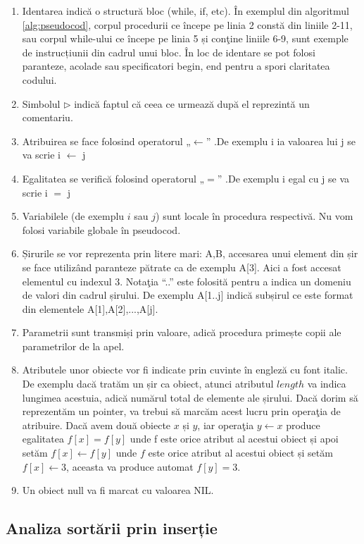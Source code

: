 \begin{enumerate}
\item {
	Identarea indică o structură bloc (while, if, etc). În exemplul din algoritmul \ref{alg:pseudocod}, corpul procedurii ce
	începe pe linia 2 constă din liniile 2-11, sau corpul while-ului ce începe pe linia 5 și conţine
	liniile 6-9, sunt exemple de instrucțiunii din cadrul unui bloc.
	În loc de identare se pot folosi paranteze, acolade sau specificatori begin, end pentru a spori claritatea codului.
}
\item {
	Simbolul $\rhd$ indică faptul că ceea ce urmează după el reprezintă un comentariu.
}
\item {
	Atribuirea se face folosind operatorul „$\leftarrow$” .De exemplu i ia valoarea lui j se va scrie i $\leftarrow$ j
}
\item {
	Egalitatea se verifică folosind operatorul „$=$” .De exemplu i egal cu j se va scrie i $=$ j
}
\item {
	Variabilele (de exemplu $i$ sau $j$) sunt locale în procedura respectivă. Nu vom folosi variabile globale în pseudocod.
}
\item {
	Șirurile se vor reprezenta prin litere mari: A,B, accesarea unui element din șir se face utilizând paranteze pătrate ca de exemplu A[3]. Aici a fost accesat elementul cu indexul 3. Notaţia “..” este folosită pentru a indica un domeniu de valori din cadrul șirului. De exemplu A[1..j] indică subșirul ce este format din elementele A[1],A[2],...,A[j].	
}
\item {
	Parametrii sunt transmiși prin valoare, adică procedura primește copii ale parametrilor de la apel.
}
\item {
	Atributele unor obiecte vor fi indicate prin cuvinte în engleză cu font italic. De exemplu dacă tratăm un șir ca obiect, atunci atributul $length$ va indica lungimea acestuia, adică numărul total de elemente ale șirului. Dacă dorim să reprezentăm un pointer, va trebui să marcăm acest lucru prin operaţia de atribuire. 
	Dacă avem două obiecte $x$ și $y$, iar operaţia $y  \leftarrow x$ produce egalitatea $f[x]=f[y]$ unde f este orice atribut al acestui obiect și apoi setăm $f[x] \leftarrow f[y]$ unde $f$ este orice atribut al acestui obiect și setăm $f[x] \leftarrow 3$, aceasta va produce automat $f[y]=3$.	
}
\item {
	Un obiect null va fi marcat cu valoarea NIL.
}

\end{enumerate}

\subsection{Analiza sortării prin inserție}


